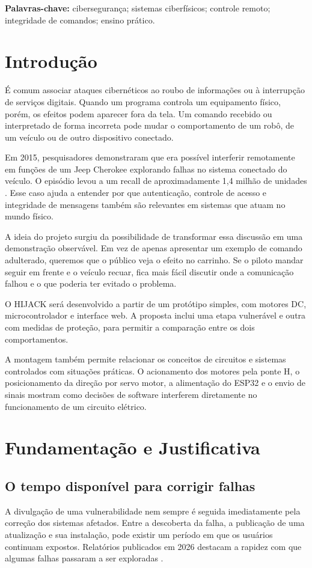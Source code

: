 \documentclass[12pt,a4paper]{article}
\begin{document}
\noindent\textbf{Palavras-chave:} cibersegurança; sistemas ciberfísicos;
controle remoto; integridade de comandos; ensino prático.
\newpage
\tableofcontents
\newpage

\section{Introdução}
É comum associar ataques cibernéticos ao roubo de informações ou à interrupção
de serviços digitais. Quando um programa controla um equipamento físico, porém,
os efeitos podem aparecer fora da tela. Um comando recebido ou interpretado de
forma incorreta pode mudar o comportamento de um robô, de um veículo ou de
outro dispositivo conectado.

Em 2015, pesquisadores demonstraram que era possível interferir remotamente
em funções de um Jeep Cherokee explorando falhas no sistema conectado do
veículo. O episódio levou a um recall de aproximadamente 1,4 milhão de
unidades \cite{wired2015jeep}. Esse caso ajuda a entender por que autenticação,
controle de acesso e integridade de mensagens também são relevantes em
sistemas que atuam no mundo físico.

A ideia do projeto surgiu da possibilidade de transformar essa discussão em
uma demonstração observável. Em vez de apenas apresentar um exemplo de
comando adulterado, queremos que o público veja o efeito no carrinho. Se o
piloto mandar seguir em frente e o veículo recuar, fica mais fácil discutir
onde a comunicação falhou e o que poderia ter evitado o problema.

O HIJACK será desenvolvido a partir de um protótipo simples, com motores DC,
microcontrolador e interface web. A proposta inclui uma etapa vulnerável e
outra com medidas de proteção, para permitir a comparação entre os dois
comportamentos.

A montagem também permite relacionar os conceitos de circuitos e sistemas
controlados com situações práticas. O acionamento dos motores pela ponte H, o posicionamento da direção por
servo motor, a alimentação do ESP32 e o envio de sinais mostram como decisões
de software interferem diretamente no funcionamento de um circuito elétrico.

\section{Fundamentação e Justificativa}
\subsection{O tempo disponível para corrigir falhas}
A divulgação de uma vulnerabilidade nem sempre é seguida imediatamente pela
correção dos sistemas afetados. Entre a descoberta da falha, a publicação de
uma atualização e sua instalação, pode existir um período em que os usuários
continuam expostos. Relatórios publicados em 2026 destacam a rapidez com que
algumas falhas passaram a ser exploradas \cite{synack2026,thn2026bas}.
\end{document}
